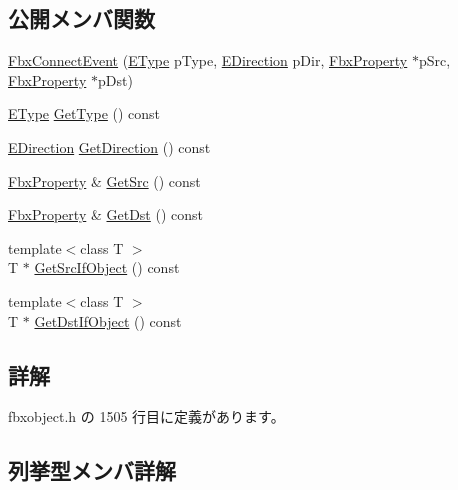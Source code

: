 \subsection*{公開メンバ関数}
\begin{DoxyCompactItemize}
\item 
\hyperlink{class_fbx_connect_event_a26c1e445ded5965f2e3a09643ab9b679}{Fbx\+Connect\+Event} (\hyperlink{class_fbx_connect_event_aa5471711f7e440a5a236ed06b08bf1d7}{E\+Type} p\+Type, \hyperlink{class_fbx_connect_event_a74f6cfad7f026059654d3bc6a582a78e}{E\+Direction} p\+Dir, \hyperlink{class_fbx_property}{Fbx\+Property} $\ast$p\+Src, \hyperlink{class_fbx_property}{Fbx\+Property} $\ast$p\+Dst)
\item 
\hyperlink{class_fbx_connect_event_aa5471711f7e440a5a236ed06b08bf1d7}{E\+Type} \hyperlink{class_fbx_connect_event_ac49976c7e8383896a63ff1e582e0ee2b}{Get\+Type} () const
\item 
\hyperlink{class_fbx_connect_event_a74f6cfad7f026059654d3bc6a582a78e}{E\+Direction} \hyperlink{class_fbx_connect_event_a0abc492bbba44390dbbba9d7dc9e0726}{Get\+Direction} () const
\item 
\hyperlink{class_fbx_property}{Fbx\+Property} \& \hyperlink{class_fbx_connect_event_adc2a02fd551701700f1d0921d7e96a73}{Get\+Src} () const
\item 
\hyperlink{class_fbx_property}{Fbx\+Property} \& \hyperlink{class_fbx_connect_event_a2b6176e2e3ce7e308909971b7534fd38}{Get\+Dst} () const
\item 
{\footnotesize template$<$class T $>$ }\\T $\ast$ \hyperlink{class_fbx_connect_event_a053adb5f16ff6d0e94e0511506070a38}{Get\+Src\+If\+Object} () const
\item 
{\footnotesize template$<$class T $>$ }\\T $\ast$ \hyperlink{class_fbx_connect_event_a7b52443ca2c001639f5776ee3540538a}{Get\+Dst\+If\+Object} () const
\end{DoxyCompactItemize}


\subsection{詳解}


 fbxobject.\+h の 1505 行目に定義があります。



\subsection{列挙型メンバ詳解}
\mbox{\label{class_fbx_connect_event_a74f6cfad7f026059654d3bc6a582a78e}} 
